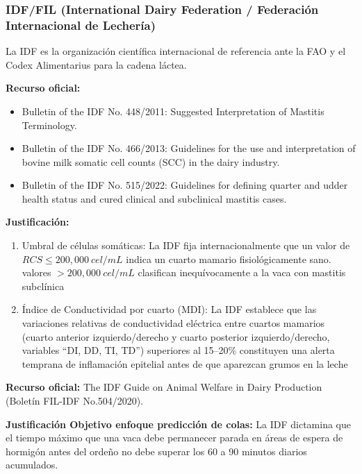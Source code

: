 \subsubsection{IDF/FIL (International Dairy Federation / Federación Internacional de Lechería)}

La IDF es la organización científica internacional de referencia ante la FAO y el Codex Alimentarius para la cadena láctea.


\textbf{Recurso oficial:}

\begin{itemize}
  \item Bulletin of the IDF No. 448/2011: Suggested Interpretation of Mastitis Terminology.
  \item Bulletin of the IDF No. 466/2013: Guidelines for the use and interpretation of bovine milk somatic cell counts (SCC) in the dairy industry.
  \item Bulletin of the IDF No. 515/2022: Guidelines for defining quarter and udder health status and cured clinical and subclinical mastitis cases.
\end{itemize}

\textbf{Justificación:}

\begin{enumerate}
  \item Umbral de células somáticas: La IDF fija internacionalmente que un valor de $\mathit{RCS} \le 200{,}000\ \mathit{cel/mL}$ indica un cuarto mamario fisiológicamente sano. valores $> 200{,}000\ \mathit{cel/mL}$ clasifican inequívocamente a la vaca con mastitis subclínica
  \item Índice de Conductividad por cuarto (MDI): La IDF establece que las variaciones relativas de conductividad eléctrica entre cuartos mamarios (cuarto anterior izquierdo/derecho y cuarto posterior izquierdo/derecho, variables “DI, DD, TI, TD”) superiores al 15--20\% constituyen una alerta temprana de inflamación epitelial antes de que aparezcan grumos en la leche
\end{enumerate}


\textbf{Recurso oficial:} The IDF Guide on Animal Welfare in Dairy Production (Boletín FIL-IDF No.504/2020).

\textbf{Justificación Objetivo enfoque predicción de colas:} La IDF dictamina que el tiempo máximo que una vaca debe permanecer parada en áreas de espera de hormigón antes del ordeño no debe superar los 60 a 90 minutos diarios acumulados.

